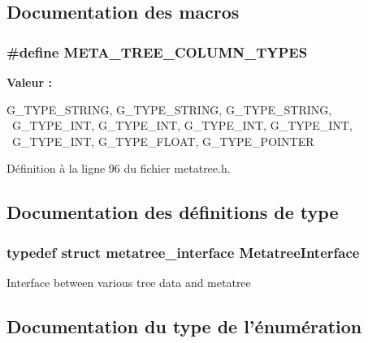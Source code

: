 \subsection{Documentation des macros}
\subsubsection[{META\_\-TREE\_\-COLUMN\_\-TYPES}]{\setlength{\rightskip}{0pt plus 5cm}\#define META\_\-TREE\_\-COLUMN\_\-TYPES}\label{metatree_8h_afa11a24cb7d209be15b8c9092a7d0b91}
{\bfseries Valeur :}
\begin{DoxyCode}
G_TYPE_STRING, G_TYPE_STRING, G_TYPE_STRING, \
                                 G_TYPE_INT, G_TYPE_INT, G_TYPE_INT, G_TYPE_INT, 
      \
                                 G_TYPE_INT, G_TYPE_FLOAT, G_TYPE_POINTER
\end{DoxyCode}


Définition à la ligne 96 du fichier metatree.h.



\subsection{Documentation des définitions de type}
\subsubsection[{MetatreeInterface}]{\setlength{\rightskip}{0pt plus 5cm}typedef struct {\bf metatree\_\-interface}  {\bf MetatreeInterface}}\label{metatree_8h_afae8c6db5e97dc2d37126d06f5d1e7d0}
Interface between various tree data and metatree 

\subsection{Documentation du type de l'énumération}
